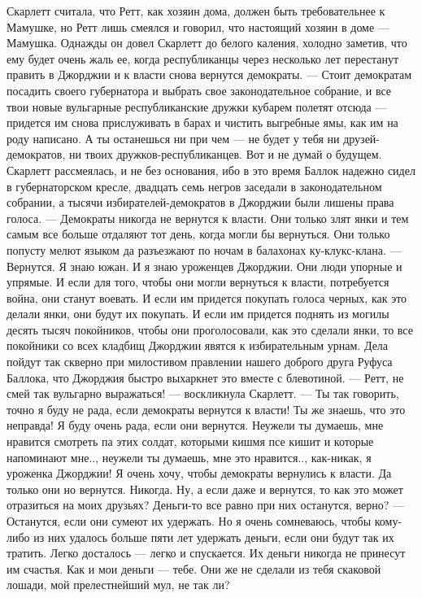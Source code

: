 Скарлетт считала, что Ретт, как хозяин дома, должен быть требовательнее к Мамушке, но Ретт лишь смеялся и говорил, что настоящий хозяин в доме — Мамушка.
Однажды он довел Скарлетт до белого каления, холодно заметив, что ему будет очень жаль ее, когда республиканцы через несколько лет перестанут править в Джорджии и к власти снова вернутся демократы.
— Стоит демократам посадить своего губернатора и выбрать свое законодательное собрание, и все твои новые вульгарные республиканские дружки кубарем полетят отсюда — придется им снова прислуживать в барах и чистить выгребные ямы, как им на роду написано. А ты останешься ни при чем — не будет у тебя ни друзей-демократов, ни твоих дружков-республиканцев. Вот и не думай о будущем.
Скарлетт рассмеялась, и не без основания, ибо в это время Баллок надежно сидел в губернаторском кресле, двадцать семь негров заседали в законодательном собрании, а тысячи избирателей-демократов в Джорджии были лишены права голоса.
— Демократы никогда не вернутся к власти. Они только злят янки и тем самым все больше отдаляют тот день, когда могли бы вернуться. Они только попусту мелют языком да разъезжают по ночам в балахонах ку-клукс-клана.
— Вернутся. Я знаю южан. И я знаю уроженцев Джорджии. Они люди упорные и упрямые. И если для того, чтобы они могли вернуться к власти, потребуется война, они станут воевать. И если им придется покупать голоса черных, как это делали янки, они будут их покупать. И если им придется поднять из могилы десять тысяч покойников, чтобы они проголосовали, как это сделали янки, то все покойники со всех кладбищ Джорджии явятся к избирательным урнам. Дела пойдут так скверно при милостивом правлении нашего доброго друга Руфуса Баллока, что Джорджия быстро выхаркнет это вместе с блевотиной.
— Ретт, не смей так вульгарно выражаться! — воскликнула Скарлетт. — Ты так говорить, точно я буду не рада, если демократы вернутся к власти! Ты же знаешь, что это неправда! Я буду очень рада, если они вернутся. Неужели ты думаешь, мне нравится смотреть па этих солдат, которыми кишмя псе кишит и которые напоминают мне.., неужели ты думаешь, мне это нравится.., как-никак, я уроженка Джорджии! Я очень хочу, чтобы демократы вернулись к власти. Да только они но вернутся. Никогда. Ну, а если даже и вернутся, то как это может отразиться на моих друзьях? Деньги-то все равно при них останутся, верно?
— Останутся, если они сумеют их удержать. Но я очень сомневаюсь, чтобы кому-либо из них удалось больше пяти лет удержать деньги, если они будут так их тратить. Легко досталось — легко и спускается. Их деньги никогда не принесут им счастья. Как и мои деньги — тебе. Они же не сделали из тебя скаковой лошади, мой прелестнейший мул, не так ли?
